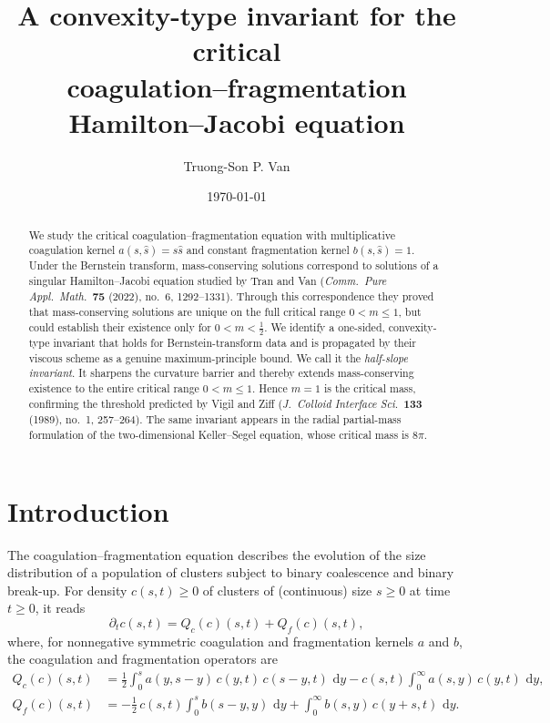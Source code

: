 \documentclass[12pt]{amsart}
\title[A convexity-type invariant for critical coagulation--fragmentation]
{A convexity-type invariant for the
critical\\ coagulation--fragmentation Hamilton--Jacobi equation}
\author{Truong-Son P. Van}
\date{\today}
\numberwithin{equation}{section}
\theoremstyle{plain}
\theoremstyle{definition}
\newcommand{\dd}{\,\mathrm{d}}
\renewcommand{\d}{\partial}
\begin{document}
\begin{abstract}
	We study the critical coagulation--fragmentation equation with multiplicative
	coagulation kernel $a(s,\hat s)=s\hat s$ and constant fragmentation kernel
	$b(s,\hat s)=1$. Under the Bernstein transform, mass-conserving solutions
	correspond to solutions of a singular Hamilton--Jacobi equation studied by
	Tran and Van (\emph{Comm.\ Pure Appl.\ Math.}\ \textbf{75} (2022), no.\ 6,
	1292--1331).
	Through this correspondence they proved that mass-conserving
	solutions are unique on the full critical range $0<m\le1$, but could establish
	their existence only for $0<m<\tfrac12$. We identify
	a one-sided,
	convexity-type invariant that holds for
	Bernstein-transform data and is propagated by their viscous scheme as a
	genuine maximum-principle bound. We call it the \emph{half-slope
		invariant}. It sharpens the curvature barrier and thereby
	extends mass-conserving existence to the entire critical range
	$0<m\le1$. Hence $m=1$ is the critical mass, confirming the threshold
	predicted by Vigil and Ziff (\emph{J.\ Colloid Interface Sci.}\ \textbf{133}
	(1989), no.\ 1, 257--264). The same invariant appears in the radial
	partial-mass formulation of the two-dimensional Keller--Segel equation, whose
	critical mass is $8\pi$.
\end{abstract}

\maketitle

\section{Introduction}

The coagulation--fragmentation equation describes the evolution of the size
distribution of a population of clusters subject to binary coalescence and
binary break-up.
For  density $c(s,t)\ge 0$ of clusters of (continuous) size $s \geq 0$ at time $t\geq 0$,
it reads
\begin{equation}\label{eq:CF}
	\d_t c(s,t) = Q_c(c)(s,t)+Q_f(c)(s,t),
\end{equation}
where, for nonnegative symmetric coagulation and fragmentation kernels $a$ and
$b$, the coagulation and fragmentation operators are
\begin{align}
	Q_c(c)(s,t) & =\frac12\int_0^s a(y,s-y)\,c(y,t)\,c(s-y,t)\,\dd y
	-c(s,t)\int_0^\infty a(s,y)\,c(y,t)\,\dd y,\label{eq:Qc}         \\
	Q_f(c)(s,t) & =-\frac12\,c(s,t)\int_0^s b(s-y,y)\,\dd y
	+\int_0^\infty b(s,y)\,c(y+s,t)\,\dd y.\label{eq:Qf}
\end{align}
\end{document}
